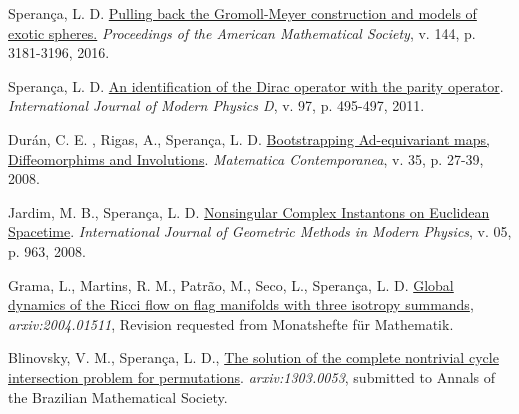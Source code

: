 \documentclass[10pt]{article}
\newenvironment{innerlist}[1][\enskip\textbullet]%
{\begin{compactitem}[#1]}{\end{compactitem}}
\begin{document}
\begin{enumerate}
\begin{innerlist}[-]
			
			
			
			
			
	
		
		
		
		
		
		\item Sperança, L. D. \href{https://www.ams.org/journals/proc/2016-144-07/S0002-9939-2015-12945-0/home.html}{Pulling back the Gromoll-Meyer construction and models of exotic spheres.} {\textit{Proceedings of the American Mathematical Society}, v. 144, p. 3181-3196, 2016}.
		
		
		
				\item Sperança, L. D. \href{https://www.worldscientific.com/doi/10.1142/S0218271814440039}{An identification of the Dirac operator with the parity operator}. { \textit{International Journal of Modern Physics D},  v. 97, p. 495-497, 2011}.
		
		
		
	
		
				\item Durán, C. E. , Rigas, A., Sperança, L. D.  \href{https://www.mat.unb.br/~matcont/35_2.pdf}{Bootstrapping Ad-equivariant maps, Diffeomorphims and Involutions}. {\textit{Matematica Contemporanea},  v. 35, p. 27-39, 2008}.
		
				\item Jardim, M. B., Sperança, L. D. \href{https://www.worldscientific.com/doi/10.1142/S0219887808003132}{Nonsingular Complex Instantons on Euclidean Spacetime}. {\textit{International Journal of Geometric Methods in Modern Physics}, v. 05, p. 963, 2008}.
		
		

\item Grama, L., Martins, R. M., Patrão, M., Seco, L., Sperança, L. D.
\href{https://arxiv.org/abs/2004.01511}{Global dynamics of the Ricci flow on flag manifolds with three isotropy summands}, \textit{{arxiv:2004.01511}}, Revision requested from  Monatshefte f\"ur Mathematik.





\item Blinovsky, V. M., Sperança, L. D., \href{https://arxiv.org/abs/1303.0053}{The solution of the complete nontrivial cycle intersection problem for permutations}. 
\textit{{arxiv:1303.0053}}, submitted to Annals of the Brazilian Mathematical Society.



\end{innerlist}
\end{enumerate}
\end{document}
